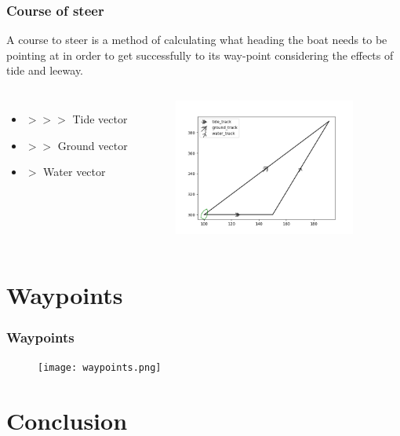 \documentclass{beamer}
\begin{document}
\begin{frame}
    \frametitle{Course of steer}

    A course to steer is a method of calculating what heading the boat needs to be pointing at in order to get successfully to its way-point considering the effects of tide and leeway. 
    \begin{columns}

        \begin{itemize}
            \item $ >>> $ Tide vector
            \item $ >> $ Ground vector
            \item $ > $ Water vector
        \end{itemize}
    
        \begin{figure}[h]
        \centering
        \includegraphics[height=4.5cm]{./pictures/course_of_steer.png}
        \end{figure}
    
    \end{columns}
\end{frame}

\section{Waypoints}

\begin{frame}
    \frametitle{Waypoints}

        \begin{figure}[h]
        \centering
        \texttt{[image: waypoints.png]}
        \end{figure}
        
\end{frame}
    


\section{Conclusion}
\end{document}
